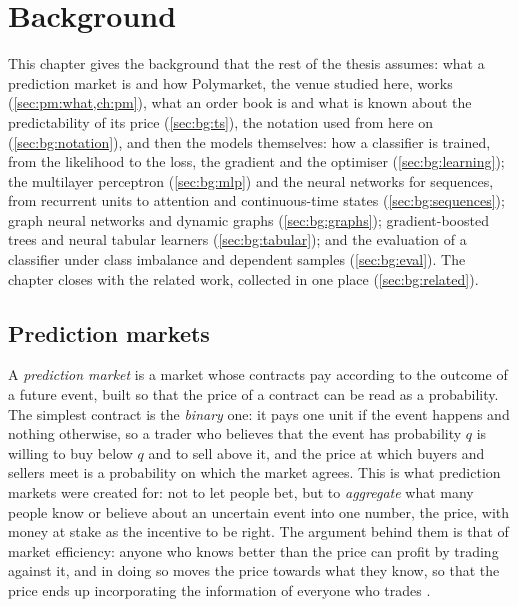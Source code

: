 \chapter{Background}
\label{ch:background}

This chapter gives the background that the rest of the thesis assumes: what a prediction
market is and how Polymarket, the venue studied here, works (\cref{sec:pm:what,ch:pm}),
what an order book is and what is known about the predictability of its price
(\cref{sec:bg:ts}), the notation used from here on
(\cref{sec:bg:notation}), and then the models themselves: how a classifier is trained, from
the likelihood to the loss, the gradient and the optimiser (\cref{sec:bg:learning}); the
multilayer perceptron (\cref{sec:bg:mlp}) and the neural networks for sequences, from
recurrent units to attention and continuous-time states (\cref{sec:bg:sequences}); graph
neural networks and dynamic
graphs (\cref{sec:bg:graphs}); gradient-boosted trees and neural tabular learners
(\cref{sec:bg:tabular}); and the evaluation of a classifier under class imbalance and
dependent samples (\cref{sec:bg:eval}).  The chapter closes with the related work,
collected in one place (\cref{sec:bg:related}).

\section{Prediction markets}
\label{sec:pm:what}

A \emph{prediction market} is a market whose contracts pay according to the outcome of a
future event, built so that the price of a contract can be read as a probability.  The
simplest contract is the \emph{binary} one: it pays one unit if the event happens and
nothing otherwise, so a trader who believes that the event has probability $q$ is willing
to buy below $q$ and to sell above it, and the price at which buyers and sellers meet is a
probability on which the market agrees.  This is what prediction markets were created
for: not to let people bet, but to \emph{aggregate} what many people know or believe
about an uncertain event into one number, the price, with money at stake as the incentive
to be right.  The argument behind them is that of market efficiency: anyone who knows
better than the price can profit by trading against it, and in doing so moves the price
towards what they know, so that the price ends up incorporating the information of
everyone who trades \cite{wolfers2004prediction,arrow2008promise}.

